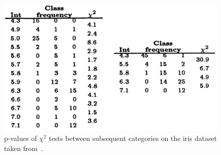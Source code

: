 %

\begin{figure}
\centering
\includegraphics[width = \textwidth]{figures/appendix/tab_chimerge.PNG}
\caption{\label{tab:chimerge_ex} p-values of $\chi^2$ tests between subsequent categories on the iris dataset taken from~\cite{kerber1992chimerge}.}
\end{figure}

